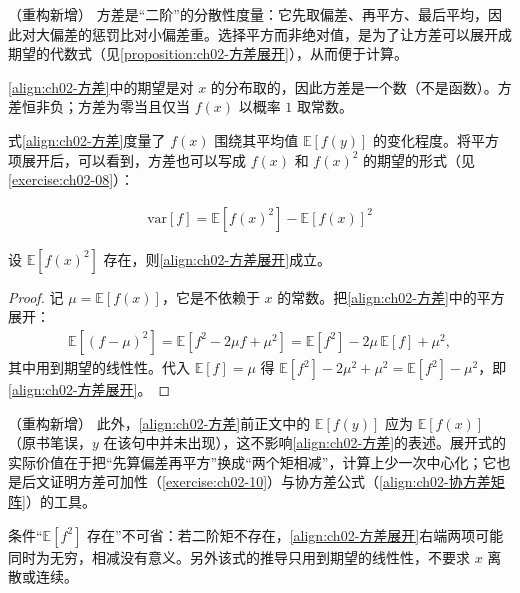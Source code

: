 \documentclass[../../main.tex]{subfiles}
\begin{document}
\begin{remark}（重构新增）
方差是“二阶”的分散性度量：它先取偏差、再平方、最后平均，因此对大偏差的惩罚比对小偏差重。选择平方而非绝对值，是为了让方差可以展开成期望的代数式（见\cref{proposition:ch02-方差展开}），从而便于计算。

\eqref{align:ch02-方差}中的期望是对 $x$ 的分布取的，因此方差是一个数（不是函数）。方差恒非负；方差为零当且仅当 $f(x)$ 以概率 $1$ 取常数。
\end{remark}

式\eqref{align:ch02-方差}度量了 $f(x)$ 围绕其平均值 $\mathbb{E}[f(y)]$ 的变化程度。将平方项展开后，可以看到，方差也可以写成 $f(x)$ 和 $f(x)^2$ 的期望的形式（见\cref{exercise:ch02-08}）：

\begin{align}
  \mathrm{var}[f] = \mathbb{E}\left[f(x)^{2}\right] - \mathbb{E}\left[f(x)\right]^{2}
  \label{align:ch02-方差展开}
\end{align}

\begin{proposition}[方差的展开式]\label{proposition:ch02-方差展开}
设 $\mathbb{E}[f(x)^2]$ 存在，则\eqref{align:ch02-方差展开}成立。
\end{proposition}

\begin{proof}
记 $\mu=\mathbb{E}[f(x)]$，它是不依赖于 $x$ 的常数。把\eqref{align:ch02-方差}中的平方展开：
\begin{align*}
  \mathbb{E}\left[(f-\mu)^2\right] = \mathbb{E}\left[f^2 - 2\mu f + \mu^2\right] = \mathbb{E}[f^2] - 2\mu\,\mathbb{E}[f] + \mu^2 ,
\end{align*}
其中用到期望的线性性。代入 $\mathbb{E}[f]=\mu$ 得 $\mathbb{E}[f^2]-2\mu^2+\mu^2 = \mathbb{E}[f^2]-\mu^2$，即\eqref{align:ch02-方差展开}。
\end{proof}

\begin{remark}（重构新增）
此外，\eqref{align:ch02-方差}前正文中的 $\mathbb{E}[f(y)]$ 应为 $\mathbb{E}[f(x)]$（原书笔误，$y$ 在该句中并未出现），这不影响\eqref{align:ch02-方差}的表述。展开式的实际价值在于把“先算偏差再平方”换成“两个矩相减”，计算上少一次中心化；它也是后文证明方差可加性（\cref{exercise:ch02-10}）与协方差公式（\eqref{align:ch02-协方差矩阵}）的工具。

条件“$\mathbb{E}[f^2]$ 存在”不可省：若二阶矩不存在，\eqref{align:ch02-方差展开}右端两项可能同时为无穷，相减没有意义。另外该式的推导只用到期望的线性性，不要求 $x$ 离散或连续。
\end{remark}
\end{document}
